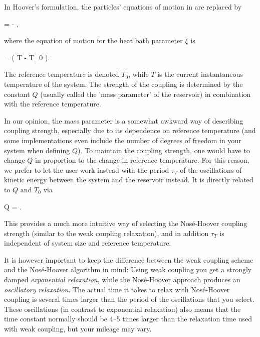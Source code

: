 In Hoover's formulation, the particles' equations of motion in
 are replaced by

\beq
{} =  - 
\xi {} ,
\label{eqn:NH-eqn-of-motion}
\eeq

where the equation of motion for the heat bath parameter $\xi$ is

\beq
{} = \left( T - T_0 \right).
\eeq

The reference temperature is denoted $T_0$, while $T$ is the current
instantaneous temperature of the system. The strength of the coupling is
determined by the constant $Q$ (usually called the 'mass parameter' 
of the reservoir) in combination with the reference temperature.

In our opinion, the mass parameter is a somewhat awkward way of 
describing coupling strength, especially due to its dependence on
reference temperature (and some implementations even include the number
of degrees of freedom in your system when defining $Q$). 
To maintain the coupling strength, one would have to change $Q$ in
proportion to the change in reference temperature. For this reason,
we prefer to let the {\gromacs} user work instead with the
period $\tau_T$ of the oscillations of kinetic energy between the 
system and the reservoir instead. It is directly related to $Q$ and $T_0$ via

\beq
Q = .
\eeq

This provides a much more intuitive way of selecting the Nos{\'e}-Hoover
coupling strength (similar to the weak coupling relaxation), 
and in addition $\tau_T$ is independent of system size and reference
temperature. 

It is however important to keep the difference between the 
weak coupling scheme and the Nos\'e-Hoover algorithm in mind: 
Using weak coupling you get a
strongly damped {\em exponential relaxation}, 
while the Nos\'e-Hoover approach
produces an {\em oscillatory relaxation}. 
The actual time it takes to relax with Nos\'e-Hoover coupling is 
several times larger than the period of the
oscillations that you select. These oscillations (in contrast
to exponential relaxation) also means that
the time constant normally should be 4--5 times larger
than the relaxation time used with weak coupling, but your 
mileage may vary.

